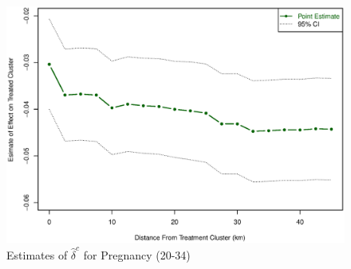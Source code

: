 \documentclass[10pt,letterpaper,subeqn]{beamer}
\begin{document}
\begin{frame}[label=dist2034]
\begin{figure}[htpb!]
\begin{center}
\caption{Estimates of $\hat\delta^c$ for Pregnancy (20-34)}
\label{TEENfig:Dist1519}
\vspace{-5mm}
\includegraphics[scale=0.44]{./../../Figures/Dist2034.eps} 
\end{center}
\end{figure}
\hyperlink{dist1519}{}
\end{frame}


\begin{frame}

\end{frame}
\end{document}
